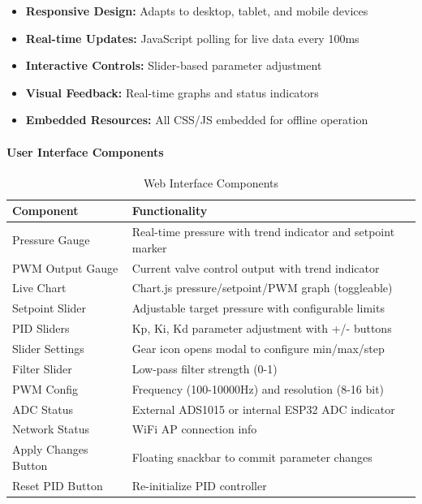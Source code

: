 \begin{itemize}
    \item \textbf{Responsive Design:} Adapts to desktop, tablet, and mobile devices
    \item \textbf{Real-time Updates:} JavaScript polling for live data every 100ms
    \item \textbf{Interactive Controls:} Slider-based parameter adjustment
    \item \textbf{Visual Feedback:} Real-time graphs and status indicators
    \item \textbf{Embedded Resources:} All CSS/JS embedded for offline operation
\end{itemize}

\paragraph{User Interface Components}
\begin{table}[H]
\centering
\begin{tabular}{@{}ll@{}}
\toprule
\textbf{Component} & \textbf{Functionality} \\
\midrule
Pressure Gauge & Real-time pressure with trend indicator and setpoint marker \\
PWM Output Gauge & Current valve control output with trend indicator \\
Live Chart & Chart.js pressure/setpoint/PWM graph (toggleable) \\
Setpoint Slider & Adjustable target pressure with configurable limits \\
PID Sliders & Kp, Ki, Kd parameter adjustment with +/- buttons \\
Slider Settings & Gear icon opens modal to configure min/max/step \\
Filter Slider & Low-pass filter strength (0-1) \\
PWM Config & Frequency (100-10000Hz) and resolution (8-16 bit) \\
ADC Status & External ADS1015 or internal ESP32 ADC indicator \\
Network Status & WiFi AP connection info \\
Apply Changes Button & Floating snackbar to commit parameter changes \\
Reset PID Button & Re-initialize PID controller \\
\bottomrule
\end{tabular}
\caption{Web Interface Components}
\end{table}

